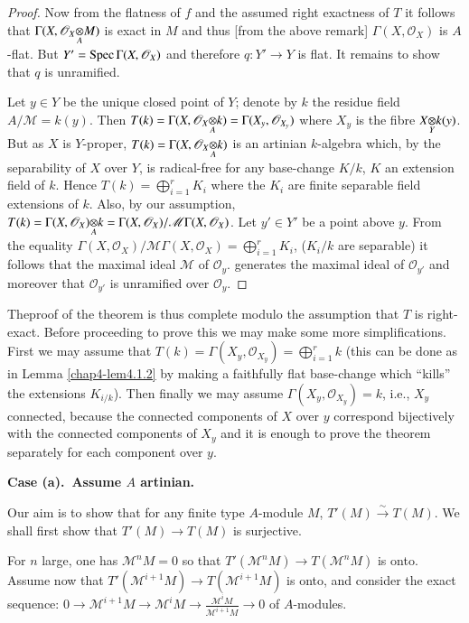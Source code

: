 \begin{proof}
Now from the flatness of $f$ and the assumed right exactness of $T$ it
follows that $\Gamma(X,\foprod{\mathscr{O}_{X}}{M}{A})$ is exact in
$M$ and thus [from the above remark] $\Gamma(X,\mathscr{O}_{X})$ is
$A$-flat. But $Y'=\operatorname{Spec}\Gamma(X,\mathscr{O}_{X})$ and therefore
$q:Y'\to Y$ is flat. It remains to show that $q$ is unramified.

Let $y\in Y$ be the unique closed point of $Y$; denote by $k$ the
residue field $A/\mathscr{M}=k(y)$. Then
$T(k)=\Gamma(X,\foprod{\mathscr{O}_{X}}{k}{A})=\Gamma(X_{y},\mathscr{O}_{X_{y}})$
where $X_{y}$ is the fibre $\foprod{X}{k(y)}{Y}$. But as $X$ is
$Y$-proper, $T(k)=\Gamma(X,\foprod{\mathscr{O}_{X}}{k}{A})$ is an
artinian $k$-algebra which, by the separability of $X$ over $Y$, is
radical-free for any base-change $K/k$, $K$ an extension field of
$k$. Hence $T(k)=\bigoplus\limits^{r}_{i=1}K_{i}$ where the $K_{i}$
are finite separable field extensions of $k$. Also, by our assumption,
$T(k)=\foprod{\Gamma(X,\mathscr{O}_{X})}{k}{A}=\Gamma(X,\mathscr{O}_{X})/\mathscr{M}\Gamma(X,\mathscr{O}_{X})$. Let
$y'\in Y'$ be a point above $y$. From the equality
$\Gamma(X,\mathscr{O}_{X})/\mathscr{M}\Gamma(X,\mathscr{O}_{X})=\bigoplus\limits^{r}_{i=1}K_{i}$,
($K_{i}/k$ are separable) it follows that the maximal ideal
$\mathscr{M}$ of $\mathscr{O}_{y}$. generates the maximal ideal of
$\mathscr{O}_{y'}$ and moreover that $\mathscr{O}_{y'}$ is unramified
over $\mathscr{O}_{y}$. 
\end{proof}

The\pageoriginale proof of the theorem is thus complete modulo the
assumption that $T$ is right-exact. Before proceeding to prove this we
may make some more simplifications. First we may assume that
$T(k)=\Gamma(X_{y},\mathscr{O}_{X_{y}})=\bigoplus\limits^{r}_{i=1}k$
(this can be done as in Lemma \ref{chap4-lem4.1.2} by making a faithfully
flat base-change which ``kills'' the extensions $K_{i/k}$). Then
finally we may assume $\Gamma(X_{y},\mathscr{O}_{X_{y}})=k$, i.e.,
$X_{y}$ connected, because the connected components of $X$ over $y$
correspond bijectively with the connected components of $X_{y}$ and
it is enough to prove the theorem separately for each component over
$y$.

\medskip
{\bf Case (a).~Assume {\boldmath$A$} artinian.}
\smallskip

Our aim is to show that for any finite type $A$-module $M$,
$T'(M)\xrightarrow{\sim}T(M)$. We shall first show that $T'(M)\to
T(M)$ is surjective.

For $n$ large, one has $\mathscr{M}^{n}M=0$ so that
$T'(\mathscr{M}^{n}M)\to T(\mathscr{M}^{n}M)$ is onto. Assume now that
$T'(\mathscr{M}^{i+1}M)\to T(\mathscr{M}^{i+1}M)$ is onto, and
consider the exact sequence: $0\to \mathscr{M}^{i+1}M\to
\mathscr{M}^{i}M\to \frac{\mathscr{M}^{i}M}{\mathscr{M}^{i+1}M}\to 0$
of $A$-modules.

